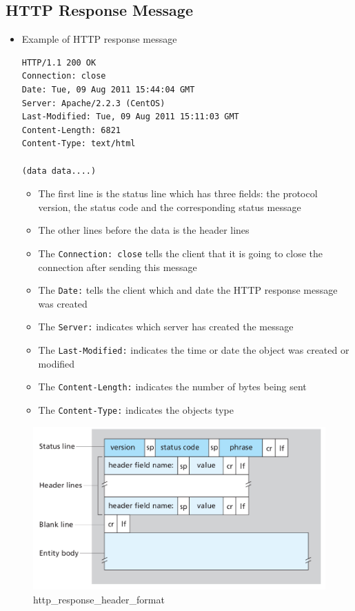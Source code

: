 \documentclass[11pt]{article}
\makeatletter
\def\maxwidth{\ifdim\Gin@nat@width>\linewidth\linewidth
    \else\Gin@nat@width\fi}
\let\Oldincludegraphics\includegraphics
\renewcommand{\includegraphics}[1]{\Oldincludegraphics[width=.8\maxwidth]{#1}}
\providecommand{\tightlist}{%
      \setlength{\itemsep}{0pt}\setlength{\parskip}{0pt}}
\makeatother
\begin{document}
    \subsection{HTTP Response Message}\label{http-response-message}

\begin{itemize}
\item
  Example of HTTP response message

\begin{verbatim}
HTTP/1.1 200 OK
Connection: close
Date: Tue, 09 Aug 2011 15:44:04 GMT
Server: Apache/2.2.3 (CentOS)
Last-Modified: Tue, 09 Aug 2011 15:11:03 GMT
Content-Length: 6821
Content-Type: text/html

(data data....)
\end{verbatim}

  \begin{itemize}
  \tightlist
  \item
    The first line is the status line which has three fields: the
    protocol version, the status code and the corresponding status
    message
  \item
    The other lines before the data is the header lines
  \item
    The \texttt{Connection:\ close} tells the client that it is going to
    close the connection after sending this message
  \item
    The \texttt{Date:} tells the client which and date the HTTP response
    message was created
  \item
    The \texttt{Server:} indicates which server has created the message
  \item
    The \texttt{Last-Modified:} indicates the time or date the object
    was created or modified
  \item
    The \texttt{Content-Length:} indicates the number of bytes being
    sent
  \item
    The \texttt{Content-Type:} indicates the objects type
  \end{itemize}
\end{itemize}

\begin{figure}
\centering
\includegraphics{img/http_response_header_format.png}
\caption{http\_response\_header\_format}
\end{figure}
\end{document}
